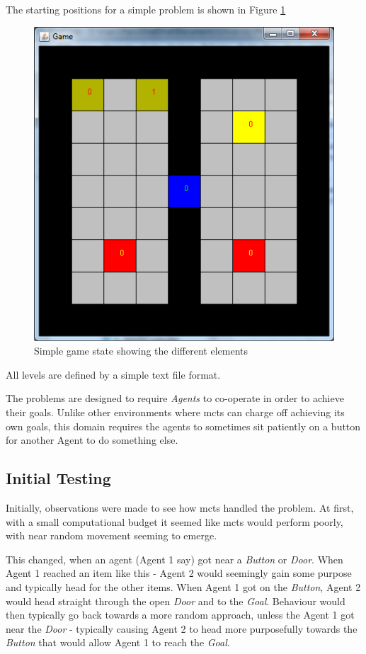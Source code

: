 \documentclass{IEEEtran}
\begin{document}
The starting positions for a simple problem is shown in Figure \ref{InitialState}
\begin{figure}[ht]
\centering
\includegraphics[scale=0.5]{InitialState}
\caption{Simple game state showing the different elements\protect\footnotemark }
\label{InitialState}
\end{figure}

All levels are defined by a simple text file format.

The problems are designed to require \emph{Agents} to co-operate in order to achieve their goals. Unlike other environments where \gls{mcts} can charge off achieving its own goals, this domain requires the agents to sometimes sit patiently on a button for another Agent to do something else.

\subsection{Initial Testing}
Initially, observations were made to see how \gls{mcts} handled the problem. At first, with a small computational budget it seemed like \gls{mcts} would perform poorly, with near random movement seeming to emerge.

This changed, when an agent (Agent 1 say) got near a \emph{Button} or \emph{Door}. When Agent 1 reached an item like this - Agent 2 would seemingly gain some purpose and typically head for the other items. When Agent 1 got on the \emph{Button}, Agent 2 would head straight through the open \emph{Door} and to the \emph{Goal}. Behaviour would then typically go back towards a more random approach, unless the Agent 1 got near the \emph{Door} - typically causing Agent 2 to head more purposefully towards the \emph{Button} that would allow Agent 1 to reach the \emph{Goal}.
\end{document}
